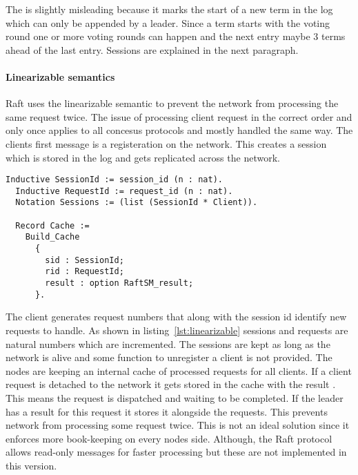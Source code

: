 The  is slightly misleading because it marks the start of
a new term in the log which can only be appended by a leader. Since a
term starts with the voting round one or more voting rounds can happen
and the next entry maybe 3 terms ahead of the last  entry.
Sessions are explained in the next paragraph.


\paragraph{Linearizable semantics}
Raft uses the linearizable semantic to prevent the network from
processing the same request twice. The issue of processing client
request in the correct order and only once applies to all
concesus protocols and mostly handled the same way.
The clients first message is a registeration on the network.
This creates a session which is stored in the log and gets
replicated across the network.

\begin{lstlisting}[style=coq,label=lst:linearizable,
caption=The definitions used to implement the linearizable semantics for raft.]
  Inductive SessionId := session_id (n : nat).
  Inductive RequestId := request_id (n : nat).
  Notation Sessions := (list (SessionId * Client)).

  Record Cache :=
    Build_Cache
      {
        sid : SessionId;
        rid : RequestId;
        result : option RaftSM_result;
      }.
\end{lstlisting}

The client generates request numbers that along with the session id identify
new requests to handle. As shown in listing~\ref{lst:linearizable} sessions
and requests are natural numbers which are incremented.  The sessions are kept as
long as the network is alive and some function to unregister a client
is not provided. The nodes are keeping an internal cache of processed
requests for all clients. If a client request is detached to the network
it gets stored in the cache with the result . This means
the request is dispatched and waiting to be completed. If the leader
has a result for this request it stores it alongside the requests. 
This prevents network from processing some request twice.
This is not an ideal solution since it enforces more book-keeping on every nodes
side. Although, the Raft protocol allows read-only messages for faster
processing but these are not implemented in this version. 

